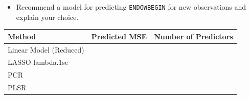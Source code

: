 \documentclass[
  letterpaper,
  DIV=11,
  numbers=noendperiod]{scrartcl}
\providecommand{\tightlist}{%
  \setlength{\itemsep}{0pt}\setlength{\parskip}{0pt}}\usepackage{longtable,booktabs,array}
\begin{document}
\begin{itemize}
\tightlist
\item
  Recommend a model for predicting \texttt{ENDOWBEGIN} for new
  observations and explain your choice.
\end{itemize}

\begin{longtable}[]{@{}lcc@{}}
\toprule\noalign{}
Method & Predicted MSE & Number of Predictors \\
\midrule\noalign{}
\endhead
\bottomrule\noalign{}
\endlastfoot
Linear Model (Reduced) & & \\
LASSO lambda.1se & & \\
PCR & & \\
PLSR & & \\
\end{longtable}
\end{document}
